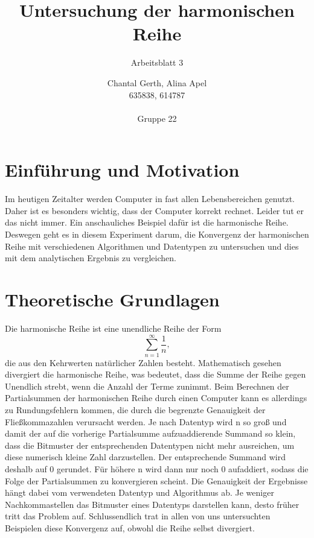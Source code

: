 \documentclass{scrreprt}
\title{Untersuchung der harmonischen Reihe}
\subtitle{Arbeitsblatt 3}
\author{%
  Chantal Gerth, Alina Apel\\635838, 614787\\ \\Gruppe 22
}
\date{}
\begin{document}
\maketitle
\tableofcontents
\thispagestyle{empty}



\newpage

\section{Einführung und Motivation}
Im heutigen Zeitalter werden Computer in fast allen Lebensbereichen genutzt. Daher ist es besonders wichtig, dass der Computer korrekt rechnet. Leider tut er das nicht immer. Ein anschauliches Beispiel dafür ist die harmonische Reihe. Deswegen geht es in diesem Experiment darum, die Konvergenz der harmonischen Reihe mit verschiedenen Algorithmen und Datentypen zu untersuchen und dies mit dem analytischen Ergebnis zu vergleichen.

\section{Theoretische Grundlagen} \label{sec:theorie}
Die harmonische Reihe ist eine unendliche Reihe der Form
\[
\sum_{n=1}^{\infty} \frac{1}{n},
\]
die aus den Kehrwerten natürlicher Zahlen besteht. Mathematisch gesehen divergiert die harmonische Reihe, was bedeutet, dass die Summe der Reihe gegen Unendlich strebt, wenn die Anzahl der Terme zunimmt. Beim Berechnen der Partialsummen der harmonischen Reihe durch einen Computer kann es allerdings zu Rundungsfehlern kommen, die durch die begrenzte Genauigkeit der Fließkommazahlen verursacht werden. Je nach Datentyp wird n so groß und damit der auf die vorherige Partialsumme aufzuaddierende Summand so klein, dass die Bitmuster der entsprechenden Datentypen nicht mehr ausreichen, um diese numerisch kleine Zahl darzustellen. Der entsprechende Summand wird deshalb auf 0 gerundet. Für höhere n wird dann nur noch 0 aufaddiert, sodass die Folge der Partialsummen zu konvergieren scheint. Die Genauigkeit der Ergebnisse hängt dabei vom verwendeten Datentyp und Algorithmus ab. Je weniger Nachkommastellen das Bitmuster eines Datentyps darstellen kann, desto früher tritt das Problem auf. Schlussendlich trat in allen von uns untersuchten Beispielen diese Konvergenz auf, obwohl die Reihe selbst divergiert.
\end{document}
